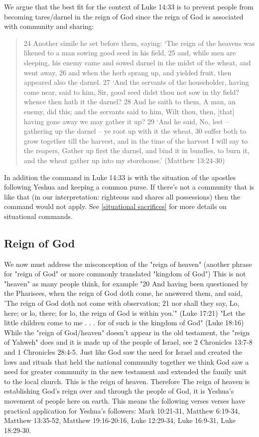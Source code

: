 \documentclass[11pt]{article}
\begin{document}
We argue that the best fit for the context of Luke 14:33 is to prevent people from becoming tares/darnel in the reign of God since the reign of God is associated with community and sharing:
 \begin{quote}
24 Another simile he set before them, saying: `The reign of the heavens was likened to a man sowing good seed in his field,
25 and, while men are sleeping, his enemy came and sowed darnel in the midst of the wheat, and went away,
26 and when the herb sprang up, and yielded fruit, then appeared also the darnel.
27 `And the servants of the householder, having come near, said to him, Sir, good seed didst thou not sow in thy field? whence then hath it the darnel?
28 And he saith to them, A man, an enemy, did this; and the servants said to him, Wilt thou, then, [that] having gone away we may gather it up?
29 `And he said, No, lest -- gathering up the darnel -- ye root up with it the wheat,
30 suffer both to grow together till the harvest, and in the time of the harvest I will say to the reapers, Gather up first the darnel, and bind it in bundles, to burn it, and the wheat gather up into my storehouse.' (Matthew 13:24-30)
 \end{quote}
In addition the command in Luke 14:33 is with the situation of the apostles following Yeshua and keeping a common purse. If there's not a community that is like that (in our interpretation: righteous and shares all possessions) then the command would not apply. See \ref{situational sacrifices} for more details on situational commands.


\subsection{Reign of God} 
We now must address the misconception of the "reign of heaven" (another phrase for "reign of God" or more commonly translated "kingdom of God") This is not "heaven" as many people think, for example  "20 And having been questioned by the Pharisees, when the reign of God doth come, he answered them, and said, 'The reign of God doth not come with observation; 21 nor shall they say, Lo, here; or lo, there; for lo, the reign of God is within you.'" (Luke 17:21) "Let the little children come to me . . . for of such is the kingdom of God" (Luke 18:16) While the "reign of God/heaven" doesn't appear in the old testament, the "reign of Yahweh" does and it is made up of the people of Israel, see 2 Chronicles 13:7-8 and 1 Chronicles 28:4-5. Just like God saw the need for Israel and created the laws and rituals that held the national community together we think God saw a need for greater community in the new testament and extended the family unit to the local church. This is the reign of heaven. Therefore The reign of heaven is establishing God's reign over and through the people of God, it is Yeshua's movement of people here on earth. \cite{kh} This means the following verses verses have practical application for Yeshua's followers:  Mark 10:21-31, Matthew 6:19-34, Matthew 13:35-52, Matthew 19:16-20:16, Luke 12:29-34, Luke 16:9-31, Luke 18:29-30. 
\end{document}
